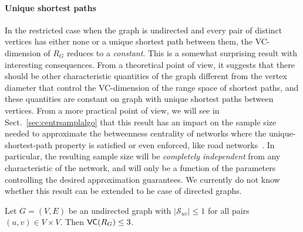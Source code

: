 \paragraph{Unique shortest paths}\label{sec:centrsamplrangeunique}
In the restricted case when the graph is undirected and
every pair of distinct vertices has either none or a unique shortest path
between them, the VC-dimension of $R_G$ reduces %
to a \emph{constant}. This is a somewhat surprising result with interesting
consequences. From a theoretical point of view, it suggests that there should be
other characteristic quantities of the graph different from the vertex diameter
that control the VC-dimension of the range space of shortest paths, and these
quantities are constant on graph with unique shortest paths between vertices.
From a more practical point of view, we will see in
Sect.~\ref{sec:centrsamplalgo} that this result has an impact on the sample size
needed to approximate the betweenness centrality of networks where the
unique-shortest-path property is satisfied or even enforced, like road
networks~\citep{GeisbergerSS08}. In particular, the resulting sample size will
be \emph{completely independent} from any characteristic of the network, and
will only be a function of the parameters controlling the desired approximation
guarantees. We currently do not know whether this result can be extended to he
case of directed graphs.

\begin{lemma}\label{lem:vcdimuppboundunique}
  Let $G=(V,E)$ be an undirected graph with $|\mathcal{S}_{uv}|\le1$ for all
  pairs $(u,v)\in V\times V$. Then $\mathsf{VC}(R_G)\le 3$.
\end{lemma}


